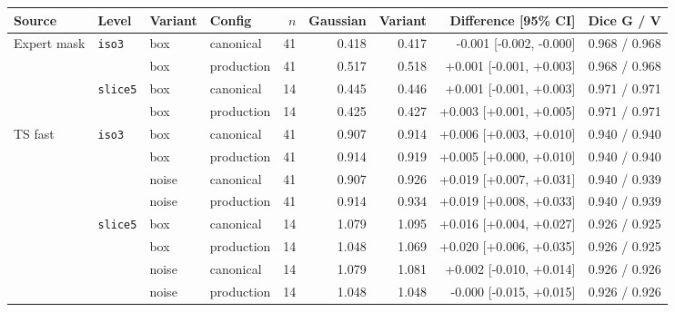 \begin{tabular}{llllrrrrr}
\toprule
Source & Level & Variant & Config & $n$ & Gaussian & Variant & Difference [95\% CI] & Dice G / V \\
\midrule
Expert mask & \texttt{iso3} & box & canonical & 41 & 0.418 & 0.417 & -0.001 [-0.002, -0.000] & 0.968 / 0.968 \\
 &  & box & production & 41 & 0.517 & 0.518 & +0.001 [-0.001, +0.003] & 0.968 / 0.968 \\
 & \texttt{slice5} & box & canonical & 14 & 0.445 & 0.446 & +0.001 [-0.001, +0.003] & 0.971 / 0.971 \\
 &  & box & production & 14 & 0.425 & 0.427 & +0.003 [+0.001, +0.005] & 0.971 / 0.971 \\
\midrule
TS fast & \texttt{iso3} & box & canonical & 41 & 0.907 & 0.914 & +0.006 [+0.003, +0.010] & 0.940 / 0.940 \\
 &  & box & production & 41 & 0.914 & 0.919 & +0.005 [+0.000, +0.010] & 0.940 / 0.940 \\
 &  & noise & canonical & 41 & 0.907 & 0.926 & +0.019 [+0.007, +0.031] & 0.940 / 0.939 \\
 &  & noise & production & 41 & 0.914 & 0.934 & +0.019 [+0.008, +0.033] & 0.940 / 0.939 \\
 & \texttt{slice5} & box & canonical & 14 & 1.079 & 1.095 & +0.016 [+0.004, +0.027] & 0.926 / 0.925 \\
 &  & box & production & 14 & 1.048 & 1.069 & +0.020 [+0.006, +0.035] & 0.926 / 0.925 \\
 &  & noise & canonical & 14 & 1.079 & 1.081 & +0.002 [-0.010, +0.014] & 0.926 / 0.926 \\
 &  & noise & production & 14 & 1.048 & 1.048 & -0.000 [-0.015, +0.015] & 0.926 / 0.926 \\
\bottomrule
\end{tabular}
